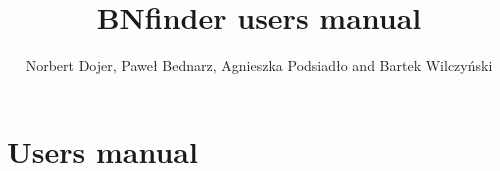 \documentclass{howto}
\title{ BNfinder users manual}
\author{Norbert Dojer, Paweł Bednarz, Agnieszka Podsiadło and Bartek Wilczy\'nski}
\begin{document}
\maketitle
\tableofcontents

\section{Users manual}
\label{sec:man}





\end{document}
